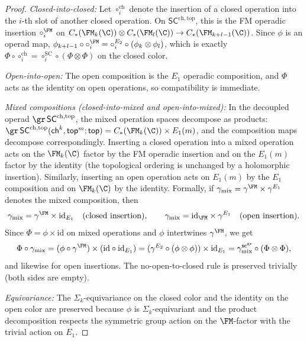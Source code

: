 \begin{proof}
\smallskip\noindent
\emph{Closed-into-closed:}
Let $\circ_i^{\mathrm{ch}}$ denote the insertion of a closed operation
into the $i$-th slot of another closed operation.
On $\mathsf{SC}^{\mathrm{ch,top}}$, this is the FM operadic
insertion $\circ_i^{\FM}$ on
$C_\ast(\FM_k(\C)) \otimes C_\ast(\FM_l(\C)) \to C_\ast(\FM_{k+l-1}(\C))$.
Since $\phi$ is an operad map,
$\phi_{k+l-1} \circ \circ_i^{\FM} = \circ_i^{E_2} \circ (\phi_k \otimes \phi_l)$,
which is exactly $\Phi \circ \circ_i^{\mathrm{ch}} = \circ_i^{\mathrm{SC}} \circ (\Phi \otimes \Phi)$
on the closed color.

\smallskip\noindent
\emph{Open-into-open:}
The open composition is the $E_1$ operadic composition, and $\Phi$
acts as the identity on open operations, so compatibility is
immediate.

\smallskip\noindent
\emph{Mixed compositions (closed-into-mixed and open-into-mixed):}
In the decoupled operad $\gr\,\mathsf{SC}^{\mathrm{ch,top}}$, the
mixed operation spaces decompose as products:
$\gr\,\mathsf{SC}^{\mathrm{ch,top}}(\mathsf{ch}^k, \mathsf{top}^m; \mathsf{top})
= C_\ast(\FM_k(\C)) \times E_1(m)$,
and the composition maps decompose correspondingly. Inserting a
closed operation into a mixed operation acts on the $\FM_k(\C)$
factor by the FM operadic insertion and on the $E_1(m)$ factor by
the identity (the topological ordering is unchanged by a holomorphic
insertion). Similarly, inserting an open operation acts on $E_1(m)$
by the $E_1$ composition and on $\FM_k(\C)$ by the identity.
Formally, if $\gamma_{\mathrm{mix}} = \gamma^{\FM} \times \gamma^{E_1}$
denotes the mixed composition, then
\[
 \gamma_{\mathrm{mix}} = \gamma^{\FM} \times \mathrm{id}_{E_1}
 \quad\text{(closed insertion)},
 \qquad
 \gamma_{\mathrm{mix}} = \mathrm{id}_{\FM} \times \gamma^{E_1}
 \quad\text{(open insertion)}.
\]
Since $\Phi = \phi \times \mathrm{id}$ on mixed operations and
$\phi$ intertwines $\gamma^{\FM}$, we get
\[
 \Phi \circ \gamma_{\mathrm{mix}}
 = (\phi \circ \gamma^{\FM}) \times (\mathrm{id} \circ \mathrm{id}_{E_1})
 = (\gamma^{E_2} \circ (\phi \otimes \phi)) \times \mathrm{id}_{E_1}
 = \gamma_{\mathrm{mix}}^{\mathsf{sc}^{\mathrm{gr}}} \circ (\Phi \otimes \Phi),
\]
and likewise for open insertions. The no-open-to-closed rule is
preserved trivially (both sides are empty).

\smallskip\noindent
\emph{Equivariance:}
The $\Sigma_k$-equivariance on the closed color and the identity on
the open color are preserved because $\phi$ is $\Sigma_k$-equivariant
and the product decomposition respects the symmetric group
action on the $\FM$-factor with the trivial action on $E_1$.


\end{proof}
